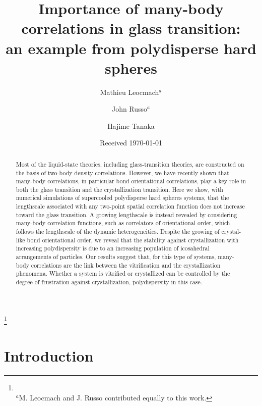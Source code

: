 \documentclass[twocolumn,superscriptaddress]{revtex4}
\begin{document}
\title{Importance of many-body correlations in glass transition:\\an example from polydisperse hard spheres} 

\author{Mathieu Leocmach$^a$}
\author{John Russo$^a$}
\thanks{\\$^a$M. Leocmach and J. Russo contributed equally to this work.}
\author{Hajime Tanaka}
\date{Received \today}

\begin{abstract}
Most of the liquid-state theories, including glass-transition theories, are constructed on the basis of two-body density correlations. 
However, we have recently shown that many-body correlations, in particular bond orientational correlations, play a key role in
both the glass transition and the crystallization transition.
Here we show, with numerical simulations of supercooled polydisperse hard spheres systems, that the lengthscale associated with any two-point spatial 
correlation function does not increase toward the glass transition. A growing lengthscale is instead revealed
by considering many-body correlation functions, such as correlators of orientational order,
which follows the lengthscale of the dynamic heterogeneities.
Despite the growing of crystal-like bond orientational order, we reveal that the stability against crystallization with increasing polydispersity
is due to an increasing population of icosahedral arrangements of particles. 
Our results suggest that, for this type of systems, many-body correlations are the link between the vitrification and the crystallization phenomena.
Whether a system is vitrified or crystallized can be controlled by the degree of frustration against crystallization, polydispersity 
in this case.  
\end{abstract}

\maketitle

\section{Introduction}
\end{document}
